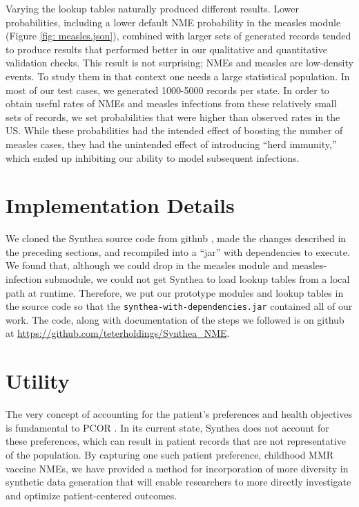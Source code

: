 \documentclass[12pt]{article}
\begin{document}
Varying the lookup tables naturally produced different results.  Lower probabilities, including a lower default NME probability in the measles module (Figure \ref{fig: measles.json}), combined with larger sets of generated records tended to produce results that performed better in our qualitative and quantitative validation checks.  This result is not surprising; NMEs and measles are low-density events.  To study them in that context one needs a large statistical population.  In most of our test cases, we generated 1000-5000 records per state.  In order to obtain useful rates of NMEs and measles infections from these relatively small sets of records, we set probabilities that were higher than observed rates in the US.  While these probabilities had the intended effect of boosting the number of measles cases, they had the unintended effect of introducing ``herd immunity,'' which ended up inhibiting our ability to model subsequent infections.

\section{Implementation Details}

We cloned the Synthea source code from github \cite{synthea-github}, made the changes described in the preceding sections, and recompiled into a ``jar'' with dependencies to execute.  We found that, although we could drop in the measles module and measles-infection submodule, we could not get Synthea to load lookup tables from a local path at runtime.  Therefore, we put our prototype modules and lookup tables in the source code so that the \texttt{synthea-with-dependencies.jar} contained all of our work.  The code, along with documentation of the steps we followed is on github at \url{https://github.com/teterholdings/Synthea_NME}.

\section{Utility}

The very concept of accounting for the patient's preferences and health objectives is fundamental to PCOR \cite{pcori}.  In its current state, Synthea does not account for these preferences, which can result in patient records that are not representative of the population.  By capturing one such patient preference, childhood MMR vaccine NMEs, we have provided a method for incorporation of more diversity in synthetic data generation that will enable researchers to more directly investigate and optimize patient-centered outcomes.  
\end{document}
